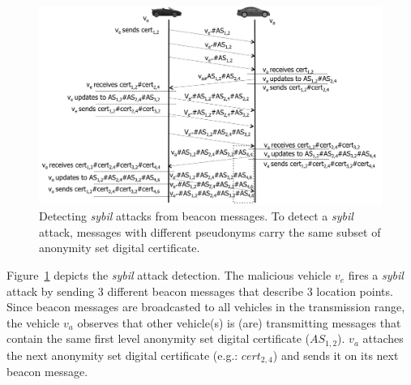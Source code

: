 \documentclass[preprint,12pt]{elsarticle}
\begin{document}


\begin{figure}[h]
\begin{center}
\includegraphics[width=4.5in]{figures/cenario-sybil-5-execution-en.png}
\caption{
Detecting \textit{sybil} attacks from beacon messages. To detect a \textit{sybil} attack, messages with different pseudonyms carry the same subset of anonymity set digital certificate.}
\label{fig:sybildetectionexecution}
\end{center}
\end{figure}

Figure~\ref{fig:sybildetectionexecution} depicts the \textit{sybil} attack detection. The malicious vehicle $v_{e}$ fires a \textit{sybil} attack by sending 3 different beacon messages that describe 3 location points. Since beacon messages are broadcasted to all vehicles in the transmission range, the vehicle $v_{a}$ observes that other vehicle(s) is (are) transmitting messages that contain the same first level anonymity set digital certificate ($AS_{1, 2}$). $v_{a}$ attaches the next anonymity set digital certificate (e.g.: $cert_{2,4}$) and sends it on its next beacon message.
\end{document}
